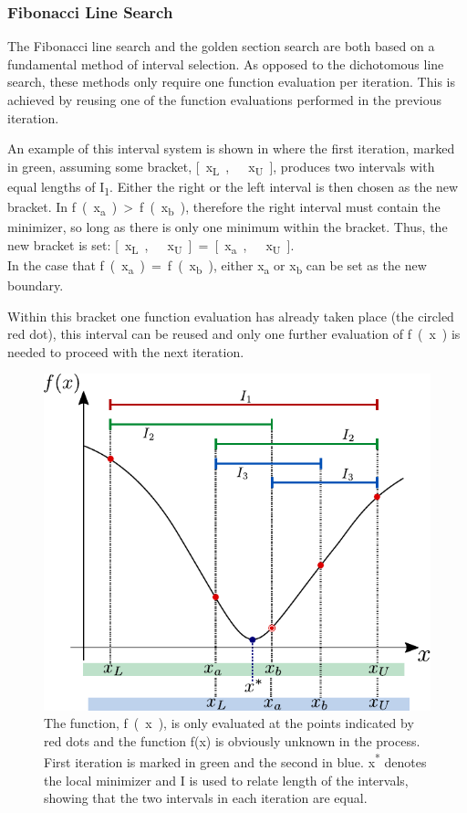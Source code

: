 \subsubsection{Fibonacci Line Search}The Fibonacci line search and the golden section search are both based on a fundamental method of interval selection. As opposed to the dichotomous line search, these methods only require one function evaluation per iteration. This is achieved by reusing one of the function evaluations performed in the previous iteration.

An example of this interval system is shown in  where the first iteration, marked in green, assuming some bracket, \si{[x_{L},\ x_{U}]}, produces two intervals with equal lengths of \si{I_1}. Either the right or the left interval is then chosen as the new bracket. In  \si{f(x_a) > f(x_b)}, therefore the right interval must contain the minimizer, so long as there is only one minimum within the bracket. Thus, the new bracket is set: \si{[x_{L},\ x_{U}] = \si{[x_{a},\ x_{U}]}}.\\
In the case that \si{f(x_a) = f(x_b)}, either \si{x_a} or \si{x_b} can be set as the new boundary.

Within this bracket one function evaluation has already taken place (the circled red dot), this interval can be reused and only one further evaluation of \si{f(x)} is needed to proceed with the next iteration.

\begin{figure}[H] 
	\centering
	\includegraphics[width=.5\textwidth]{figures/fibonacciIntervalSystem}
	\caption{The function, \si{f(x)}, is only evaluated at the points indicated by red dots and the function f(x) is obviously unknown in the process. First iteration is marked in green and the second in blue. \si{x^*} denotes the local minimizer and \si{I} is used to relate length of the intervals, showing that the two intervals in each iteration are equal.}
	\label{fibonacciIntervalSystem}
\end{figure}

